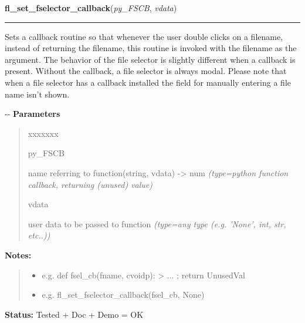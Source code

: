 \hspace{.8\funcindent}\begin{boxedminipage}{\funcwidth}

    \raggedright \textbf{fl\_set\_fselector\_callback}(\textit{py\_FSCB}, \textit{vdata})

    \vspace{-1.5ex}

    \rule{\textwidth}{0.5\fboxrule}
\setlength{\parskip}{2ex}

Sets a callback routine so that whenever the user double clicks on a
filename, instead of returning the filename, this routine is invoked with
the filename as the argument. The behavior of the file selector is
slightly different when a callback is present. Without the callback, a
file selector is always modal. Please note that when a file selector has
a callback installed the field for manually entering a file name isn't
shown.

-{}-
\setlength{\parskip}{1ex}
      \textbf{Parameters}
      \vspace{-1ex}

      \begin{quote}
        \begin{Ventry}{xxxxxxx}

          \item[py\_FSCB]


name referring to function(string, vdata) -> num
            {\it (type=python function callback, returning (unused) value)}

          \item[vdata]


user data to be passed to function
            {\it (type=any type (e.g. 'None', int, str, etc..))}

        \end{Ventry}

      \end{quote}

\textbf{Notes:}
\begin{quote}
  \begin{itemize}

  \item
    \setlength{\parskip}{0.6ex}

e.g. def fsel\_cb(fname, cvoidp): > ... ; return UnusedVal


  \item 
e.g. fl\_set\_fselector\_callback(fsel\_cb, None)


\end{itemize}

\end{quote}

\textbf{Status:} 
Tested + Doc + Demo = OK


    \end{boxedminipage}

